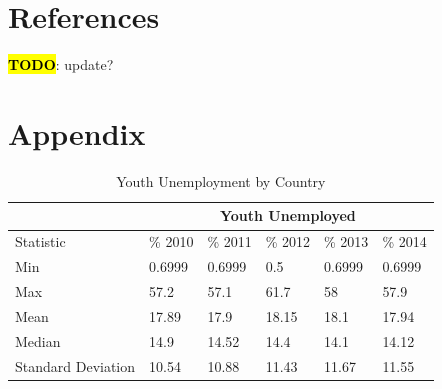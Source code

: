 \documentclass{article}
\newcommand{\TODO}{\textcolor{red}{\textbf{\hl{TODO}}}}
\begin{document}
\pagebreak

\section{References} \TODO: update? \theendnotes

\section{Appendix} 
\begin{table}[ht]
\centering
\begin{tabular}{|l|l|l|l|l|l|}
\hline
          &  \multicolumn{5}{c|}{Youth Unemployed} \\ \hline
Statistic          &  \%  2010 &  \% 2011 &  \% 2012 &  \%  2013 & \% 2014 \\ \hline
Min                & 0.6999                    & 0.6999                    & 0.5                       & 0.6999                    & 0.6999                    \\ \hline
Max                & 57.2                      & 57.1                      & 61.7                      & 58                        & 57.9                      \\ \hline
Mean               & 17.89                     & 17.9                      & 18.15                     & 18.1                      & 17.94                     \\ \hline
Median             & 14.9                      & 14.52                     & 14.4                      & 14.1                      & 14.12                     \\ \hline
Standard Deviation & 10.54                     & 10.88                     & 11.43                     & 11.67                     & 11.55                     \\ \hline
\end{tabular}
\caption{Youth Unemployment by Country}
\label{summary-statistic-table-youth-unemployment}
\end{table}
\end{document}
